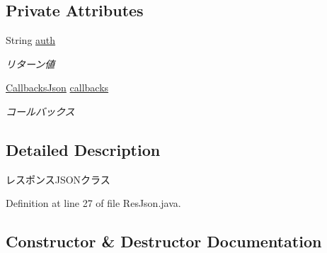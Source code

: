 \subsection*{Private Attributes}
\begin{DoxyCompactItemize}
\item 
\mbox{\label{classjp_1_1gr_1_1java__conf_1_1yuta__yoshinaga_1_1reversi_1_1model_1_1_res_json_a025a6255e8c44b7a6c1e1503e1195e84}} 
String \hyperlink{classjp_1_1gr_1_1java__conf_1_1yuta__yoshinaga_1_1reversi_1_1model_1_1_res_json_a025a6255e8c44b7a6c1e1503e1195e84}{auth}
\begin{DoxyCompactList}\small\item\em リターン値 \end{DoxyCompactList}\item 
\mbox{\label{classjp_1_1gr_1_1java__conf_1_1yuta__yoshinaga_1_1reversi_1_1model_1_1_res_json_a39c4406106b7bfae1aeb9c56f4a51f46}} 
\hyperlink{classjp_1_1gr_1_1java__conf_1_1yuta__yoshinaga_1_1reversi_1_1model_1_1_callbacks_json}{Callbacks\+Json} \hyperlink{classjp_1_1gr_1_1java__conf_1_1yuta__yoshinaga_1_1reversi_1_1model_1_1_res_json_a39c4406106b7bfae1aeb9c56f4a51f46}{callbacks}
\begin{DoxyCompactList}\small\item\em コールバックス \end{DoxyCompactList}\end{DoxyCompactItemize}


\subsection{Detailed Description}
レスポンス\+J\+S\+O\+Nクラス 

Definition at line 27 of file Res\+Json.\+java.



\subsection{Constructor \& Destructor Documentation}
\mbox{\label{classjp_1_1gr_1_1java__conf_1_1yuta__yoshinaga_1_1reversi_1_1model_1_1_res_json_ac67902ff0ff40d4b25e3ded78b5098a2}} 
